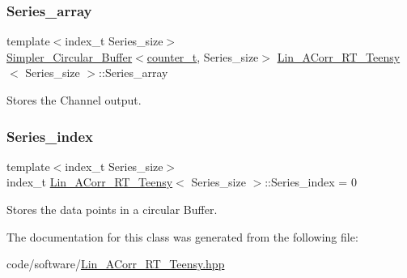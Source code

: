 \mbox{\label{classLin__ACorr__RT__Teensy_a9a619d1a74076f0bac8b7f03acebbb75}} 
\subsubsection{\texorpdfstring{Series\+\_\+array}{Series\_array}}
{\footnotesize\ttfamily template$<$index\+\_\+t Series\+\_\+size$>$ \\
\hyperlink{classSimpler__Circular__Buffer}{Simpler\+\_\+\+Circular\+\_\+\+Buffer}$<$\hyperlink{types_8hpp_a22f279793847eba127de149437848c48}{counter\+\_\+t}, Series\+\_\+size$>$ \hyperlink{classLin__ACorr__RT__Teensy}{Lin\+\_\+\+A\+Corr\+\_\+\+R\+T\+\_\+\+Teensy}$<$ Series\+\_\+size $>$\+::Series\+\_\+array}



Stores the Channel output. 

\mbox{\label{classLin__ACorr__RT__Teensy_a495539383a4cab5ff611545361600599}} 
\subsubsection{\texorpdfstring{Series\+\_\+index}{Series\_index}}
{\footnotesize\ttfamily template$<$index\+\_\+t Series\+\_\+size$>$ \\
index\+\_\+t \hyperlink{classLin__ACorr__RT__Teensy}{Lin\+\_\+\+A\+Corr\+\_\+\+R\+T\+\_\+\+Teensy}$<$ Series\+\_\+size $>$\+::Series\+\_\+index = 0}



Stores the data points in a circular Buffer. 



The documentation for this class was generated from the following file\+:\begin{DoxyCompactItemize}
\item 
code/software/\hyperlink{Lin__ACorr__RT__Teensy_8hpp}{Lin\+\_\+\+A\+Corr\+\_\+\+R\+T\+\_\+\+Teensy.\+hpp}\end{DoxyCompactItemize}

